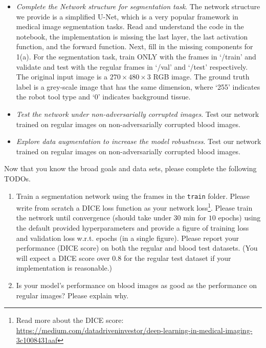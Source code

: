 \documentclass[a4paper]{article}
\begin{document}
\begin{enumerate}
		\begin{itemize}
			\item \textit{Complete the Network structure for segmentation task}. The network structure we provide is a simplified U-Net, which is a very popular framework in medical image segmentation tasks.  Read and understand the code in the notebook, the implementation is missing the last layer, the last activation function, and the forward function. Next, fill in the missing components for 1(a). For the segmentation task, train ONLY with the frames in `/train' and validate and test with the regular frames in `/val' and `/test' respectively. The original input image is a $270 \times 480 \times 3$ RGB image. The ground truth label is a grey-scale image that has the same dimension, where `255' indicates the robot tool type and `0' indicates background tissue. 

                \item \textit{Test the network under non-adversarially corrupted images}. Test our network trained on regular images on non-adversarially corrupted blood images. 

                \item \textit{Explore data augmentation to increase the model robustness}. Test our network trained on regular images on non-adversarially corrupted blood images. 

		\end{itemize}
		Now that you know the broad goals and data sets, please complete the following TODOs.
		\begin{enumerate}
			\item Train a segmentation network using the frames in the \texttt{train} folder. Please write from scratch a DICE loss function as your network loss\footnote{Read more about the DICE score: \url{https://medium.com/datadriveninvestor/deep-learning-in-medical-imaging-3c1008431aaf}}. Please train the network until convergence (should take under $30$ min for $10$ epochs) using the default provided hyperparameters and provide a figure of training loss and validation loss w.r.t. epochs (in a single figure). Please report your performance (DICE score) on both the regular and blood test datasets. (You will expect a DICE score over 0.8 for the regular test dataset if your implementation is reasonable.) 

                \item Is your model's performance on blood images as good as the performance on regular images? Please explain why.
			

\end{enumerate}
\end{enumerate}
\end{document}
